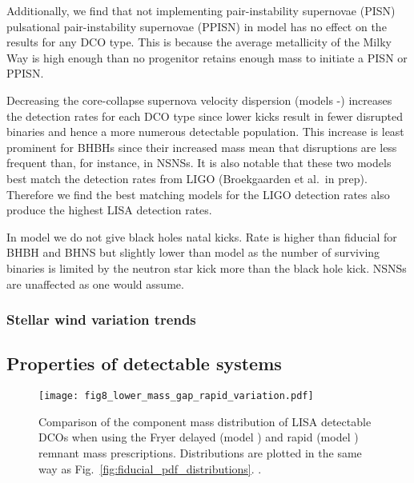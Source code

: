 Additionally, we find that not implementing pair-instability supernovae (PISN) pulsational pair-instability supernovae (PPISN) in model \modNoPISN{} has no effect on the results for any DCO type. This is because the average metallicity of the Milky Way is high enough than no progenitor retains enough mass to initiate a PISN or PPISN.

Decreasing the core-collapse supernova velocity dispersion (models \modSigLow{}-\modSigLower{}) increases the detection rates for each DCO type since lower kicks result in fewer disrupted binaries and hence a more numerous detectable population. This increase is least prominent for BHBHs since their increased mass mean that disruptions are less frequent than, for instance, in NSNSs. It is also notable that these two models best match the detection rates from LIGO (Broekgaarden et al.\ in prep). Therefore we find the best matching models for the LIGO detection rates also produce the highest LISA detection rates.

 In model \modNoBH{} we do not give black holes natal kicks. Rate is higher than fiducial for BHBH and BHNS but slightly lower than model \modSigLower{} as the number of surviving binaries is limited by the neutron star kick more than the black hole kick. NSNSs are unaffected as one would assume.

\subsubsection{Stellar wind variation trends}


\subsection{Properties of detectable systems}\label{sec:property_variations}

\begin{figure}[htb]
    \centering
    \texttt{[image: fig8\_lower\_mass\_gap\_rapid\_variation.pdf]}
    \caption{Comparison of the component mass distribution of LISA detectable DCOs when using the Fryer delayed (model \modFid{}) and rapid (model \modRapid{}) remnant mass prescriptions. Distributions are plotted in the same way as Fig.~\ref{fig:fiducial_pdf_distributions}. \href{https://github.com/TomWagg/detecting-DCOs-in-LISA/blob/main/paper/figures/fig8_lower_mass_gap_rapid_variation.pdf}{\faFileImage} \href{https://github.com/TomWagg/detecting-DCOs-in-LISA/blob/main/paper/figure_notebooks/variations.ipynb}{\faBook}.}
    \label{fig:lower_mass_gap_variation}
\end{figure}

